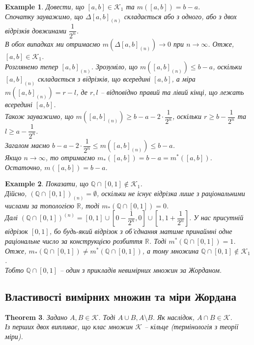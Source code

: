\documentclass[a4paper, 10pt]{article}
\theoremstyle{theoremdd}
\newtheorem{theorem}{Theorem}[subsection]
\theoremstyle{theoremdd}
\theoremstyle{theoremdd}
\theoremstyle{theoremdd}
\newtheorem{example}[theorem]{Example}
\theoremstyle{theoremdd}
\theoremstyle{theoremdd}
\theoremstyle{theoremdd}
\theoremstyle{theoremdd}
\begin{document}
\begin{example}
Довести, що $[a,b] \in \mathcal{K}_1$ та $m([a,b]) = b-a$.\\
Спочатку зауважимо, що $\Delta [a,b]_{(n)}$ складається або з одного, або з двох відрізків довжинами $\dfrac{1}{2^n}$.\\
В обох випадках ми отримаємо $m(\Delta [a,b]_{(n)}) \to 0$ при $n \to \infty$. Отже, $[a,b] \in \mathcal{K}_1$.\\
Розглянемо тепер $[a,b]_{(n)}$. Зрозуміло, що $m([a,b]_{(n)}) \leq b-a$, оскільки $[a,b]_{(n)}$ складається з відрізків, що всередині $[a,b]$, а міра $m([a,b]_{(n)}) = r - l$, де $r,l$ -- відповідно правий та лівий кінці, що лежать всередині $[a,b]$.\\
Також зауважимо, що $m([a,b]_{(n)}) \geq b-a -2 \cdot \dfrac{1}{2^n}$, оскільки $r \geq b- \dfrac{1}{2^n}$ та $l \geq a- \dfrac{1}{2^n}$.\\
Загалом маємо $b-a- 2 \cdot \dfrac{1}{2^n} \leq m([a,b]_{(n)}) \leq b-a$.\\
Якщо $n \to \infty$, то отримаємо $m_*([a,b]) = b-a = m^*([a,b])$.\\
Остаточно, $m([a,b]) = b-a$.
\end{example}

\begin{example}
Показати, що $\mathbb{Q} \cap [0,1] \not\in \mathcal{K}_1$.\\
Дійсно, $\left(\mathbb{Q} \cap [0,1] \right)_{(n)} = \emptyset$, оскільки не існує відрізка лише з раціональними числами за топологією $\mathbb{R}$, тоді $m_*(\mathbb{Q} \cap [0,1]) = 0$.\\
Далі $\left( \mathbb{Q} \cap [0,1] \right)^{(n)} = [0,1] \cup \left[ 0 - \dfrac{1}{2^n}, 0 \right] \cup \left[ 1, 1 + \dfrac{1}{2^n} \right]$. У нас присутній відрізок $[0,1]$, бо будь-який відрізок з об'єднання матиме принаймні одне раціональне число за конструкцією розбиття $\mathbb{R}$. Тоді $m^*(\mathbb{Q} \cap [0,1]) = 1$.\\
Отже, $m_*(\mathbb{Q} \cap [0,1]) \neq m^*(\mathbb{Q} \cap [0,1])$, а тому множина $\mathbb{Q} \cap [0,1] \not\in \mathcal{K}_1$.\\
Тобто $\mathbb{Q} \cap [0,1]$ -- один з прикладів невимірних множин за Жорданом.
\end{example}

\subsection{Властивості вимірних множин та міри Жордана}
\begin{theorem}
Задано $A,B \in \mathcal{K}$. Тоді $A \cup B, A \setminus B$. Як наслідок, $A \cap B \in \mathcal{K}$.\\
Із перших двох випливає, що клас множин $\mathcal{K}$ -- кільце (термінологія з теорії міри).
\end{theorem}
\end{document}
